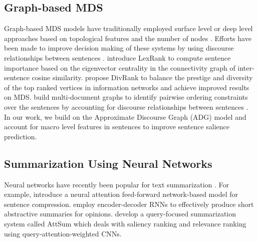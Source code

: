 \documentclass[11pt,a4paper]{article}
\begin{document}
\subsection{Graph-based MDS}
Graph-based MDS models have traditionally employed surface level \cite{erkan2004lexrank,mihalcea2005language,wan2006improved} or deep level \cite{pardo2006modeling,antiqueira2009complex} approaches based on topological features and the number of nodes \cite{albert2002statistical}. Efforts have been made to improve decision making of these systems by using discourse relationships between sentences \cite{radev2000common,radev2001newsinessence}.
 introduce LexRank to compute sentence importance based on the eigenvector centrality in the connectivity graph of inter-sentence cosine similarity.
 propose DivRank to balance the prestige and diversity of the top ranked vertices in information networks and achieve improved results on MDS.
 build multi-document graphs to identify pairwise ordering constraints over the sentences by accounting for discourse relationships between sentences \cite{mann1988rhetorical}.
In our work, we build on the Approximate Discourse Graph (ADG) model \cite{christensen2013towards} and account for macro level features in sentences to improve sentence salience prediction.

\subsection{Summarization Using Neural Networks}
Neural networks have recently been popular for text summarization \cite{kaageback2014extractive,rush2015neural,yin2015optimizing,cao2016attsum,wang2016neural,cheng2016neural,nallapati2016abstractive,nallapati2017summarunner,see2017get}.
For example,  introduce a neural attention feed-forward network-based model for sentence compression.
 employ encoder-decoder RNNs to effectively produce short abstractive summaries for opinions.
 develop a query-focused summarization system called AttSum which deals with saliency ranking and relevance ranking using query-attention-weighted CNNs.
\end{document}
